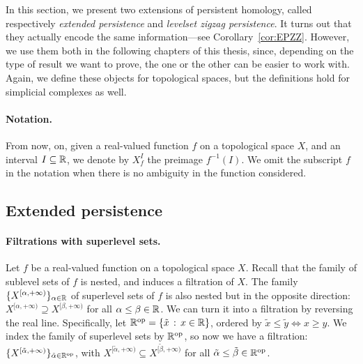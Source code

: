 In this section, we present two extensions of persistent homology, called respectively {\em extended persistence}
and  {\em levelset zigzag persistence}. It turns out that they actually encode the same information---see Corollary~\ref{cor:EPZZ}.
However, we use them both in the following chapters of this thesis, since, depending on the type of result we want to prove,
the one or the other can be easier to work with. Again, we define these objects for topological spaces, 
but the definitions hold for simplicial complexes as well.

\paragraph*{Notation.} From now, on, given a real-valued function $f$ on a topological space $X$, and an
interval $I\subseteq\mathbb{R}$, we denote by $X_f^I$ the preimage
$f^{-1}(I)$. We omit the subscript $f$ in the notation when there is
no ambiguity in the function considered.

\subsection{Extended persistence}\label{sec:extended}



\paragraph*{Filtrations with superlevel sets.} 
Let $f$ be a real-valued function on a topological space $X$.
Recall that the family of sublevel sets of $f$ is nested, and induces a filtration of $X$.
The family $\{X^{[\alpha, +\infty)}\}_{\alpha\in\mathbb{R}}$ of superlevel sets of $f$ is also
nested but in the opposite direction: $X^{[\alpha, +\infty)}\supseteq X^{[\beta, +\infty)}$
for all $\alpha\leq\beta\in\mathbb{R}$. We can turn it into a filtration by
reversing the real line. Specifically, let $\mathbb{R}^{\text{op}}=\{\tilde{x}\,:\,x\in\mathbb{R}\}$,
ordered by $\tilde{x}\leq\tilde{y}\Leftrightarrow x\geq y$. We index
the family of superlevel sets by $\mathbb{R}^{\text{op}}$, so now we have a
filtration: $\{X^{[\tilde\alpha, +\infty)}\}_{\tilde\alpha\in\mathbb{R}^{\text{op}}}$, with
$X^{[\tilde\alpha, +\infty)}\subseteq X^{[\tilde\beta, +\infty)}$ for all
$\tilde\alpha\leq\tilde\beta\in\mathbb{R}^{\text{op}}$.

